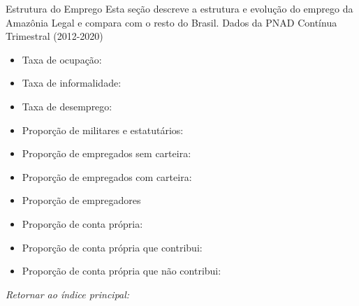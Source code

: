 \begin{frame}[label=_estrutura_emprego]{Estrutura do Emprego}
Esta seção descreve a estrutura e evolução do emprego da Amazônia Legal e compara com o resto do Brasil. Dados da PNAD Contínua Trimestral (2012-2020)
\begin{footnotesize}
\begin{itemize}
\item{Taxa de ocupação: \hyperlink{_estrutura_emprego_taxa_de_ocupacao}{}}
\item{Taxa de informalidade: \hyperlink{_estrutura_emprego_taxa_de_informalidade}{}}
\item{Taxa de desemprego: \hyperlink{_estrutura_emprego_taxa_de_desemprego}{}}
\item{Proporção de militares e estatutários: \hyperlink{_estrutura_emprego_prop_militar}{}}
\item{Proporção de empregados sem carteira: \hyperlink{_estrutura_emprego_prop_empregadoSC}{}}
\item{Proporção de empregados com carteira: \hyperlink{_estrutura_emprego_prop_empregadoCC}{}}
\item{Proporção de empregadores \hyperlink{_estrutura_emprego_prop_empregador}{}}
\item{Proporção de conta própria: \hyperlink{_estrutura_emprego_prop_cpropria}{}}
\item{Proporção de conta própria que contribui: \hyperlink{_estrutura_emprego_prop_cpropriaC}{}}
\item{Proporção de conta própria que não contribui: \hyperlink{_estrutura_emprego_prop_cpropriaNc}{}}
\end{itemize}
\end{footnotesize}

\begin{small}
\textit{Retornar ao índice principal: \hyperlink{indice_principal}{} }
\end{small}

\end{frame}

